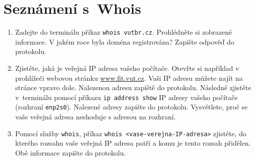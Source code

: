 \section{Seznámení s~Whois}
\begin{enumerate}
    \item Zadejte do terminálu příkaz \texttt{whois vutbr.cz}. Prohlédněte si zobrazené informace. V jakém roce byla doména registrována? Zapište odpověď do protokolu.
    \item Zjistěte, jaká je veřejná IP adresa vašeho počítače. Otevřte si například v prohlížeči webovou stránku \url{www.fit.vut.cz}. Vaši IP adresu můžete najít na stránce vpravo dole. Nalezenou adresu zapiště do protokolu. Následně zjistěte v~terminálu pomocí příkazu \texttt{ip address show} IP adresy vašeho počítače (rozhraní \texttt{enp2s0}). Nalezené adresy zapište do protokolu. Vysvětlete, proč se vaše veřejná adresa neshoduje s adresou na rozhraní. 
    \item Pomocí služby {\tt  whois}, příkaz \texttt{whois <vase-verejna-IP-adresa>} zjistěte, do kterého rozsahu vaše veřejná IP adresa patří a komu je tento rozsah přidělen. Obě informace zapište do protokolu.
\end{enumerate}


